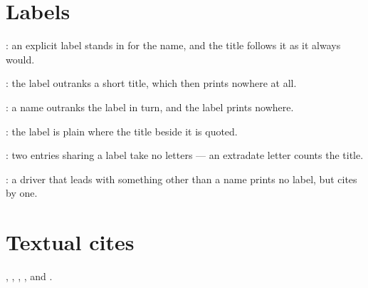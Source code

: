 \documentclass[acmsmall,nonacm,natbib=false]{acmart}
\begin{document}
\thispagestyle{empty}

\section*{Labels}
\cite{LbPlain}: an explicit label stands in for the name, and the title follows it as it always would.

\cite{LbShort}: the label outranks a short title, which then prints nowhere at all.

\cite{LbNamed}: a name outranks the label in turn, and the label prints nowhere.

\cite{LbThesis}: the label is plain where the title beside it is quoted.

\cite{LbEchoA,LbEchoB}: two entries sharing a label take no letters --- an extradate letter counts the title.

\cite{LbMisc}: a driver that leads with something other than a name prints no label, but cites by one.

\section*{Textual cites}
\textcite{LbPlain}, \textcite{LbShort}, \textcite{LbNamed}, \textcite{LbThesis}, and \textcite{LbMisc}.

\printbibliography
\end{document}
